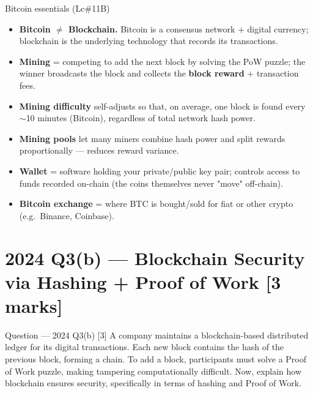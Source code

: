 \documentclass[12pt,a4paper]{article}
\begin{document}
\begin{algobox}{Bitcoin essentials (Lc\#11B)}
\begin{itemize}[noitemsep]
  \item \textbf{Bitcoin $\neq$ Blockchain.} Bitcoin is a consensus network + digital currency; blockchain is the underlying technology that records its transactions.
  \item \textbf{Mining} = competing to add the next block by solving the PoW puzzle; the winner broadcasts the block and collects the \textbf{block reward} + transaction fees.
  \item \textbf{Mining difficulty} self-adjusts so that, on average, one block is found every $\sim$10 minutes (Bitcoin), regardless of total network hash power.
  \item \textbf{Mining pools} let many miners combine hash power and split rewards proportionally --- reduces reward variance.
  \item \textbf{Wallet} = software holding your private/public key pair; controls access to funds recorded on-chain (the coins themselves never "move" off-chain).
  \item \textbf{Bitcoin exchange} = where BTC is bought/sold for fiat or other crypto (e.g.\ Binance, Coinbase).
\end{itemize}
\end{algobox}

\section{2024 Q3(b) --- Blockchain Security via Hashing + Proof of Work [3 marks]}

\begin{qbox}{Question --- 2024 Q3(b) [3]}
A company maintains a blockchain-based distributed ledger for its digital transactions. Each new block contains the hash of the previous block, forming a chain. To add a block, participants must solve a Proof of Work puzzle, making tampering computationally difficult. Now, explain how blockchain ensures security, specifically in terms of hashing and Proof of Work.
\end{qbox}
\end{document}
